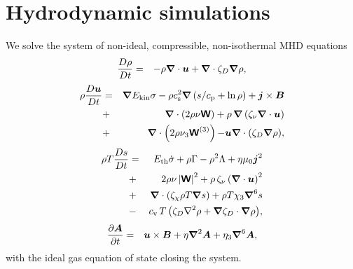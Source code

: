 \documentclass[fleqn,usenatbib]{mnras}
\newcommand\ESK{E_{\rm kin}}
\newcommand\EST{E_{\rm th}}
\newcommand{\vect}[1]{{{\mbox{\boldmath $#1$}}}}%
\begin{document}
\section{Hydrodynamic simulations}
 We solve the system of non-ideal, compressible, non-isothermal MHD equations
  \begin{eqnarray}
  \label{eq:mass}
    \frac{D\rho}{Dt} &=& 
    -\rho \vect\nabla \cdot \vect{u}
    +\vect\nabla \cdot\zeta_D\vect\nabla\rho,
  \end{eqnarray}
  \begin{eqnarray}
  \label{eq:mom}
    \rho\frac{D\vect{u}}{Dt} &=& 
    \vect\nabla{\ESK\sigma}
    -\rho c_{\rm s}^2\vect\nabla\left({s}/{c_{\rm p}}+\ln\rho\right)
    +\vect{j}\times\vect{B}
    \nonumber\\
    &+&\vect\nabla\cdot \left(2\rho\nu{\mathbfss W}\right)
    +\rho\,\vect\nabla\left(\zeta_{\nu}\vect\nabla \cdot \vect{u} \right)
    \nonumber\\
    &+&\vect\nabla\cdot \left(2\rho\nu_3{\mathbfss W}^{(3)}\right)
  {-\vect u\vect{\nabla}\cdot\left(\zeta_D\vect{\nabla}\rho\right)},
  \end{eqnarray}
  \begin{eqnarray}
  \label{eq:ent}
    \rho T\frac{D s}{Dt} &=&
     \EST\dot\sigma +\rho\Gamma
    -\rho^2\Lambda +\eta\mu_0\vect{j}^2 
    \nonumber\\
    &+&2 \rho \nu\left|{\mathbfss W}\right|^{2}
    +\rho\,\zeta_{\nu}\left(\vect\nabla \cdot \vect{u} \right)^2
    \nonumber\\
    &+&\vect\nabla\cdot\left(\zeta_\chi\rho T\vect\nabla s\right)
    +\rho T\chi_3\vect\nabla^6 s
    \nonumber\\
    &-& {c_{\rm{v}}\,T \left(
    \zeta_D\nabla^2\rho + \vect\nabla\zeta_D\cdot\vect\nabla\rho\right)},
  \end{eqnarray}
  \begin{eqnarray}
  \label{eq:ind}
    \frac{\partial \vect{A}}{\partial t} &=&
    \vect{u}\times\vect{B}
    +\eta\vect\nabla^2\vect{A}
    +\eta_3\vect\nabla^6\vect{A},
  \end{eqnarray}
 with the ideal gas equation of state closing the system.
\end{document}
